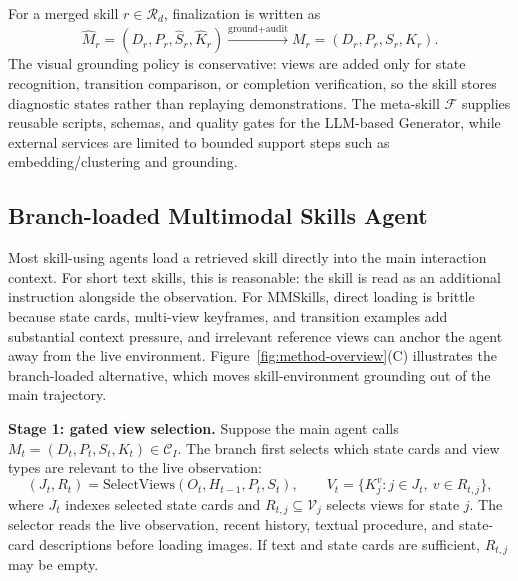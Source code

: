 \documentclass{llmxive}
\begin{document}
For a merged skill $r\in\mathcal{R}_d$, finalization is written as
\begin{equation}
    \widehat{M}_r=(D_r,P_r,\widehat{S}_r,\widehat{K}_r)
    \xrightarrow{\text{ground+audit}}
    M_r=(D_r,P_r,S_r,K_r).
\end{equation}
The visual grounding policy is conservative: views are added only for state recognition, transition comparison, or completion verification, so the skill stores diagnostic states rather than replaying demonstrations. The meta-skill $\mathcal{F}$ supplies reusable scripts, schemas, and quality gates for the LLM-based Generator, while external services are limited to bounded support steps such as embedding/clustering and grounding.

\subsection{Branch-loaded Multimodal Skills Agent}
\label{sec:method-branch}

Most skill-using agents load a retrieved skill directly into the main interaction context. For short text skills, this is reasonable: the skill is read as an additional instruction alongside the observation. For MMSkills, direct loading is brittle because state cards, multi-view keyframes, and transition examples add substantial context pressure, and irrelevant reference views can anchor the agent away from the live environment. Figure~\ref{fig:method-overview}(C) illustrates the branch-loaded alternative, which moves skill-environment grounding out of the main trajectory.

\textbf{Stage 1: gated view selection.} Suppose the main agent calls $M_t=(D_t,P_t,S_t,K_t)\in\mathcal{C}_I$. The branch first selects which state cards and view types are relevant to the live observation:
\begin{equation}
    (J_t,R_t)=\text{SelectViews}(O_t,H_{t-1},P_t,S_t),
    \qquad
    V_t=\{K_j^v:j\in J_t,\ v\in R_{t,j}\},
    \label{eq:branch-stage1}
\end{equation}
where $J_t$ indexes selected state cards and $R_{t,j}\subseteq\mathcal{V}_j$ selects views for state $j$. The selector reads the live observation, recent history, textual procedure, and state-card descriptions before loading images. If text and state cards are sufficient, $R_{t,j}$ may be empty.
\end{document}
